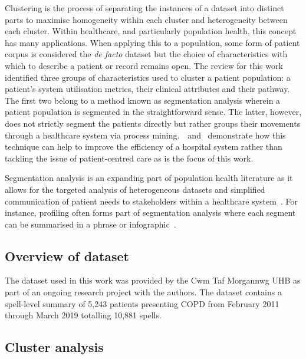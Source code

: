 Clustering is the process of separating the instances of a dataset into distinct
parts to maximise homogeneity within each cluster and heterogeneity between each
cluster. Within healthcare, and particularly population health, this concept has
many applications. When applying this to a population, some form of patient
corpus is considered the \emph{de facto} dataset but the choice of
characteristics with which to describe a patient or record remains open. The
review for this work identified three groups of characteristics used to cluster
a patient population: a patient's system utilisation metrics, their clinical
attributes and their pathway. The first two belong to a method known as
segmentation analysis wherein a patient population is segmented in the
straightforward sense. The latter, however, does not strictly segment the
patients directly but rather groups their movements through a healthcare system
via process mining.~\cite{AG2018}~and~\cite{DDGM+12015} demonstrate how this
technique can help to improve the efficiency of a hospital system rather than
tackling the issue of patient-centred care as is the focus of this work.

Segmentation analysis is an expanding part of population health literature as it
allows for the targeted analysis of heterogeneous datasets and simplified
communication of patient needs to stakeholders within a healthcare
system~\cite{VMD2016review, YKTT+12018}. For instance, profiling often forms
part of segmentation analysis where each segment can be summarised in a phrase
or infographic~\cite{VMD2016, YSKT+42019}.


\subsection{Overview of dataset}\label{subsec:overview}

The dataset used in this work was provided by the Cwm Taf Morgannwg UHB as part
of an ongoing research project with the authors. The dataset contains a
spell-level summary of 5,243 patients presenting COPD from February 2011 through
March 2019 totalling 10,881 spells. 

\subsection{Cluster analysis}\label{subsec:clusters}

